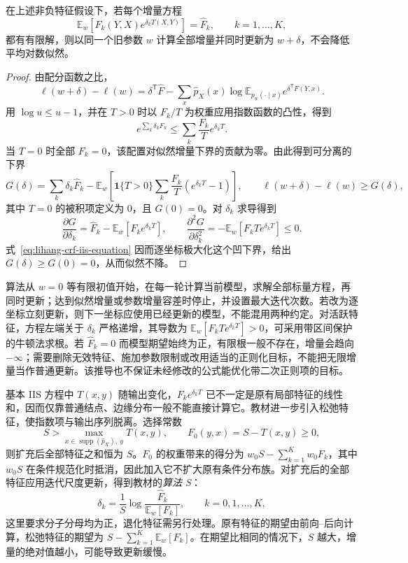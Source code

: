 \begin{proposition}
\label{prop:lihang-crf-iis-update}
在上述非负特征假设下，若每个增量方程
\begin{equation}
\label{eq:lihang-crf-iis-equation}
  \mathbb E_w\!\left[F_k(Y,X)e^{\delta_kT(X,Y)}\right]
  =\widehat F_k,\qquad k=1,\ldots,K,
\end{equation}
都有有限解，则以同一个旧参数 $w$ 计算全部增量并同时更新为 $w+\delta$，不会降低平均对数似然。
\end{proposition}
\begin{proof}
由配分函数之比，
\[
  \ell(w+\delta)-\ell(w)
  =\delta^{\mathsf T}\widehat F
   -\sum_x\widehat p_X(x)\log
        \mathbb E_{p_w(\cdot\mid x)}e^{\delta^{\mathsf T}F(Y,x)}.
\]
用 $\log u\leq u-1$，并在 $T>0$ 时以 $F_k/T$ 为权重应用指数函数的凸性，得到
\[
  e^{\sum_k\delta_kF_k}
  \leq\sum_k\frac{F_k}{T}e^{\delta_kT}.
\]
当 $T=0$ 时全部 $F_k=0$，该配置对似然增量下界的贡献为零。由此得到可分离的下界
\[
  G(\delta)=\sum_k\delta_k\widehat F_k
    -\mathbb E_w\!\left[
       \mathbf1\{T>0\}\sum_k\frac{F_k}{T}
                     (e^{\delta_kT}-1)\right],
  \qquad \ell(w+\delta)-\ell(w)\geq G(\delta),
\]
其中 $T=0$ 的被积项定义为 $0$，且 $G(0)=0$。对 $\delta_k$ 求导得到
\[
  \frac{\partial G}{\partial\delta_k}
    =\widehat F_k-\mathbb E_w[F_ke^{\delta_kT}],\qquad
  \frac{\partial^2G}{\partial\delta_k^2}
    =-\mathbb E_w[F_kT e^{\delta_kT}]\leq0.
\]
式~\eqref{eq:lihang-crf-iis-equation} 因而逐坐标极大化这个凹下界，给出 $G(\delta)\geq G(0)=0$，从而似然不降。
\end{proof}

算法从 $w=0$ 等有限初值开始，在每一轮计算当前模型，求解全部标量方程，再同时更新；达到似然增量或参数增量容差时停止，并设置最大迭代次数。若改为逐坐标立刻更新，则下一坐标应使用已经更新的模型，不能混用两种约定。对活跃特征，方程左端关于 $\delta_k$ 严格递增，其导数为 $\mathbb E_w[F_kT e^{\delta_kT}]>0$，可采用带区间保护的牛顿法求根。若 $\widehat F_k=0$ 而模型期望始终为正，有限根一般不存在，增量会趋向 $-\infty$；需要删除无效特征、施加参数限制或改用适当的正则化目标，不能把无限增量当作普通更新。该推导也不保证未经修改的公式能优化带二次正则项的目标。

基本 IIS 方程中 $T(x,y)$ 随输出变化，$F_k e^{\delta_kT}$ 已不一定是原有局部特征的线性和，因而仅靠普通结点、边缘分布一般不能直接计算它。教材进一步引入松弛特征，使指数项与输出序列脱离。选择常数
\[
  S>\max_{x\in\operatorname{supp}(\widehat p_X),\ y}T(x,y),\qquad
  F_0(y,x)=S-T(x,y)\geq0,
\]
则扩充后全部特征之和恒为 $S$。$F_0$ 的权重带来的得分为 $w_0S-\sum_{k=1}^K w_0F_k$，其中 $w_0S$ 在条件规范化时抵消，因此加入它不扩大原有条件分布族。对扩充后的全部特征应用迭代尺度更新，得到教材的\emph{算法 S}：
\begin{equation}
\label{eq:lihang-crf-iis-S}
  \delta_k=\frac1S\log\frac{\widehat F_k}{\mathbb E_w[F_k]},
  \qquad k=0,1,\ldots,K,
\end{equation}
这里要求分子分母均为正，退化特征需另行处理。原有特征的期望由前向--后向计算，松弛特征的期望为 $S-\sum_{k=1}^K\mathbb E_w[F_k]$。在期望比相同的情况下，$S$ 越大，增量的绝对值越小，可能导致更新缓慢。

